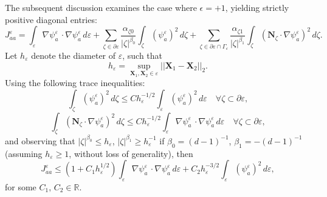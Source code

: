 The subsequent discussion examines the case where $\epsilon = +1$, yielding strictly positive diagonal entries:
\begin{equation}
	J^{\varepsilon}_{aa} = \int_{\varepsilon} \nabla \psi^{\varepsilon}_{a} \, \cdot \nabla \psi^{\varepsilon}_{a} \, d \varepsilon + \sum_{\zeta \in \partial \varepsilon} \frac{\alpha_{\zeta0}}{|\zeta|^{\beta_0}} \int_{\zeta} \left( \psi_a^{\varepsilon} \right)^2 \, d \zeta + \sum_{\zeta \in \partial \varepsilon \cap \Gamma_\varepsilon} \frac{\alpha_{\zeta1}}{|\zeta|^{\beta_1}} \int_{\zeta} \left( \mathbf{N}_{\zeta} \cdot \nabla \psi^{\varepsilon}_a \right)^2 \, d \zeta.
\end{equation}
Let $h_{\varepsilon}$ denote the diameter of $\varepsilon$, such that
\begin{equation}
	h_{\varepsilon} = \sup_{\mathbf{X}_1, \mathbf{X}_2 \in \varepsilon} ||\mathbf{X}_1 - \mathbf{X}_2||_2.
\end{equation}
Using the following trace inequalities:
\begin{equation}
	\int_{\zeta} \left( \psi_a^{\varepsilon} \right)^2 \, d \zeta \leq C h_\varepsilon^{-1/2} \int_{\varepsilon} \left( \psi_a^{\varepsilon} \right)^2 \, d \varepsilon \quad \forall \zeta \subset \partial \varepsilon,
\end{equation}
\begin{equation}
	\int_{\zeta} \left( \mathbf{N}_{\zeta} \cdot \nabla \psi^{\varepsilon}_a \right)^2 \, d \zeta \leq C h_\varepsilon^{-1/2} \int_{\varepsilon} \nabla \psi^{\varepsilon}_{a} \, \cdot \nabla \psi^{\varepsilon}_{a} \, d \varepsilon \quad \forall \zeta \subset \partial \varepsilon,
\end{equation}
and observing that $|\zeta|^{\beta_0} \leq h_\varepsilon$, $|\zeta|^{\beta_1} \geq h_\varepsilon^{-1}$ if $\beta_0 = (d-1)^{-1}$, $\beta_1 = -(d-1)^{-1}$ (assuming $h_\varepsilon \geq 1$, without loss of generality), then
\begin{equation}
	J^{\varepsilon}_{aa} \leq (1 + C_1 h_\varepsilon^{1/2}) \int_{\varepsilon} \nabla \psi^{\varepsilon}_{a} \, \cdot \nabla \psi^{\varepsilon}_{a} \, d \varepsilon + C_2 h_\varepsilon^{-3/2} \int_{\varepsilon} \left( \psi_a^{\varepsilon} \right)^2 \, d \varepsilon,
\end{equation}
for some $C_1, \, C_2 \in \mathbb{R}$.

